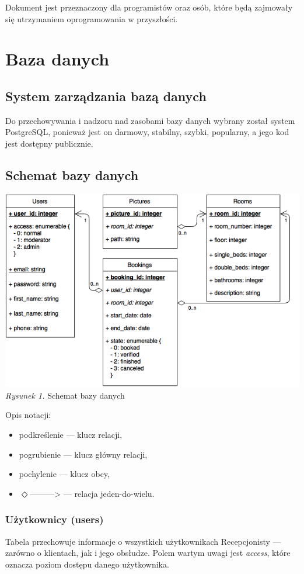 \documentclass [11pt, a4paper, leqno] {article}
\begin{document}
Dokument jest przeznaczony dla programistów oraz osób, które będą zajmowały się utrzymaniem oprogramowania w przyszłości.

\section{Baza danych}
\subsection{System zarządzania bazą danych}
\noindent
Do przechowywania i nadzoru nad zasobami bazy danych wybrany został system PostgreSQL, ponieważ jest on darmowy, stabilny, szybki, popularny, a jego kod jest dostępny publicznie.

\subsection{Schemat bazy danych}


\begin{center}
\includegraphics[scale=0.7]{recepcjonistadb}
\textit{Rysunek 1.} Schemat bazy danych
\end{center}

\newpage
\noindent
Opis notacji: 
\begin{itemize}
  \item podkreślenie --- klucz relacji,
  \item pogrubienie --- klucz główny relacji,
  \item pochylenie --- klucz obcy,
  \item $\Diamond$---------> --- relacja jeden-do-wielu.
\end{itemize}

\subsubsection{Użytkownicy (users)}
\noindent
Tabela przechowuje informacje o wszystkich użytkownikach Recepcjonisty --- zarówno o klientach, jak i  jego obsłudze. Polem wartym uwagi jest \textit{access}, które oznacza poziom dostępu danego użytkownika.
\end{document}
